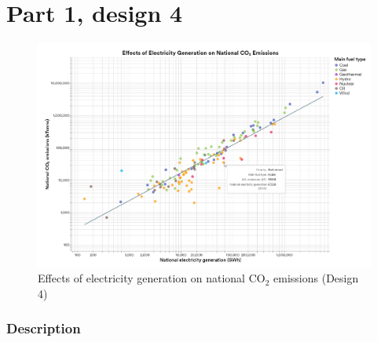 \hypertarget{part-1-design-4}{
\section{Part 1, design 4}\label{part-1-design-4}}

\begin{figure}[ht]
  \centering
  \includegraphics[width=\textwidth]{../img/design4}
  \caption{Effects of electricity generation on national CO$_2$ emissions (Design 4)}
\end{figure}

\hypertarget{description}{
\subsubsection{Description}\label{description}}

